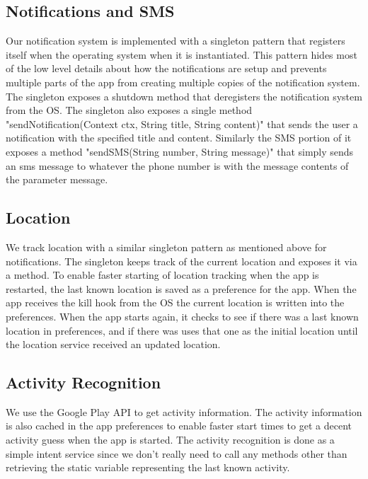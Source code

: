 \subsection{Notifications and SMS}
Our notification system is implemented with a singleton pattern that registers itself when the operating system when it is instantiated. This pattern hides most of the low level details about how the notifications are setup and prevents multiple parts of the app from creating multiple copies of the notification system. The singleton exposes a shutdown method that deregisters the notification system from the OS. The singleton also exposes a single method "sendNotification(Context ctx, String title, String content)" that sends the user a notification with the specified title and content. Similarly the SMS portion of it exposes a method "sendSMS(String number, String message)" that simply sends an sms message to whatever the phone number is with the message contents of the parameter message.

\subsection{Location}
We track location with a similar singleton pattern as mentioned above for notifications. The singleton keeps track of the current location and exposes it via a method. To enable faster starting of location tracking when the app is restarted, the last known location is saved as a preference for the app. When the app receives the kill hook from the OS the current location is written into the preferences. When the app starts again, it checks to see if there was a last known location in preferences, and if there was uses that one as the initial location until the location service received an updated location.

\subsection{Activity Recognition}
We use the Google Play API to get activity information. The activity information is also cached in the app preferences to enable faster start times to get a decent activity guess when the app is started. The activity recognition is done as a simple intent service since we don't really need to call any methods other than retrieving the static variable representing the last known activity.

